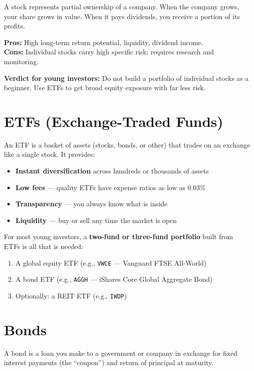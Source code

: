 \documentclass[12pt, a4paper]{book}
\begin{document}
A stock represents partial ownership of a company. When the company grows, your share grows in value. When it pays dividends, you receive a portion of its profits.

\textbf{Pros:} High long-term return potential, liquidity, dividend income.\\
\textbf{Cons:} Individual stocks carry high specific risk; requires research and monitoring.

\textbf{Verdict for young investors:} Do not build a portfolio of individual stocks as a beginner. Use ETFs to get broad equity exposure with far less risk.

\section{ETFs (Exchange-Traded Funds)}

An ETF is a basket of assets (stocks, bonds, or other) that trades on an exchange like a single stock. It provides:
\begin{itemize}[leftmargin=1.5cm]
  \item \textbf{Instant diversification} across hundreds or thousands of assets
  \item \textbf{Low fees} --- quality ETFs have expense ratios as low as 0.03\%
  \item \textbf{Transparency} --- you always know what is inside
  \item \textbf{Liquidity} --- buy or sell any time the market is open
\end{itemize}

For most young investors, a \textbf{two-fund or three-fund portfolio} built from ETFs is all that is needed:
\begin{enumerate}[leftmargin=1.5cm]
  \item A global equity ETF (e.g., \texttt{VWCE} --- Vanguard FTSE All-World)
  \item A bond ETF (e.g., \texttt{AGGH} --- iShares Core Global Aggregate Bond)
  \item Optionally: a REIT ETF (e.g., \texttt{IWDP})
\end{enumerate}

\section{Bonds}

A bond is a loan you make to a government or company in exchange for fixed interest payments (the ``coupon'') and return of principal at maturity.
\end{document}
